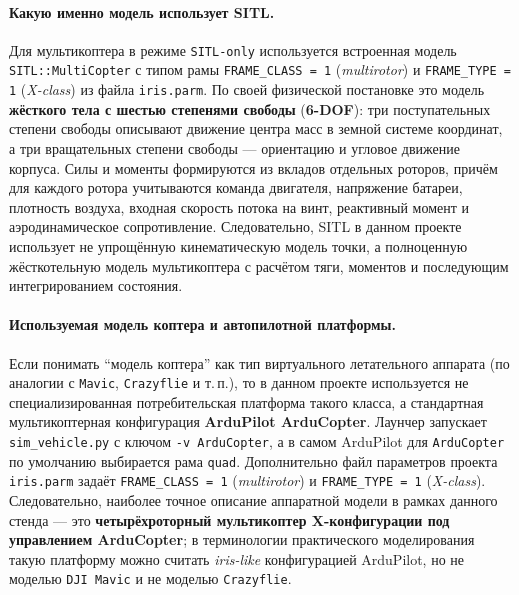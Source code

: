 \documentclass[12pt,a4paper]{article}
\begin{document}
\paragraph{Какую именно модель использует SITL.}
Для мультикоптера в режиме \texttt{SITL-only} используется встроенная модель \texttt{SITL::MultiCopter} с типом рамы \texttt{FRAME\_CLASS = 1} (\emph{multirotor}) и \texttt{FRAME\_TYPE = 1} (\emph{X-class}) из файла \texttt{iris.parm}. По своей физической постановке это модель \textbf{жёсткого тела с шестью степенями свободы} (\textbf{6-DOF}): три поступательных степени свободы описывают движение центра масс в земной системе координат, а три вращательных степени свободы --- ориентацию и угловое движение корпуса. Силы и моменты формируются из вкладов отдельных роторов, причём для каждого ротора учитываются команда двигателя, напряжение батареи, плотность воздуха, входная скорость потока на винт, реактивный момент и аэродинамическое сопротивление. Следовательно, SITL в данном проекте использует не упрощённую кинематическую модель точки, а полноценную жёсткотельную модель мультикоптера с расчётом тяги, моментов и последующим интегрированием состояния.

\paragraph{Используемая модель коптера и автопилотной платформы.}
Если понимать ``модель коптера'' как тип виртуального летательного аппарата (по аналогии с \texttt{Mavic}, \texttt{Crazyflie} и т.\,п.), то в данном проекте используется не специализированная потребительская платформа такого класса, а стандартная мультикоптерная конфигурация \textbf{ArduPilot ArduCopter}. Лаунчер запускает \texttt{sim\_vehicle.py} с ключом \texttt{-v ArduCopter}, а в самом ArduPilot для \texttt{ArduCopter} по умолчанию выбирается рама \texttt{quad}. Дополнительно файл параметров проекта \texttt{iris.parm} задаёт \texttt{FRAME\_CLASS = 1} (\emph{multirotor}) и \texttt{FRAME\_TYPE = 1} (\emph{X-class}). Следовательно, наиболее точное описание аппаратной модели в рамках данного стенда --- это \textbf{четырёхроторный мультикоптер X-конфигурации под управлением ArduCopter}; в терминологии практического моделирования такую платформу можно считать \emph{iris-like} конфигурацией ArduPilot, но не моделью \texttt{DJI Mavic} и не моделью \texttt{Crazyflie}.
\end{document}
